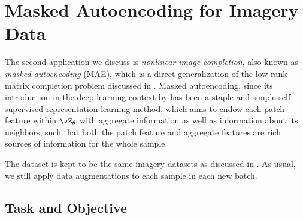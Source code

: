 \documentclass[../../book-main.tex]{subfiles}
\begin{document}
 

\section{Masked Autoencoding for Imagery Data}\label{sec:image_completion}

The second application we discuss is \textit{nonlinear image completion}, also known as \textit{masked autoencoding} (MAE), which is a direct generalization of the low-rank matrix completion problem discussed in . Masked autoencoding, since its introduction in the deep learning context by \cite{he2022masked} has been a staple and simple self-supervised representation learning method, which aims to endow each patch feature within \(\vZ_{\theta}\) with aggregate information as well as information about its neighbors, such that both the patch feature and aggregate features are rich sources of information for the whole sample. 

The dataset is kept to be the same imagery datasets as discussed in . As usual, we still apply data augmentations to each sample in each new batch. 

\subsection{Task and Objective}\label{sub:image_completion_objective}
\end{document}

